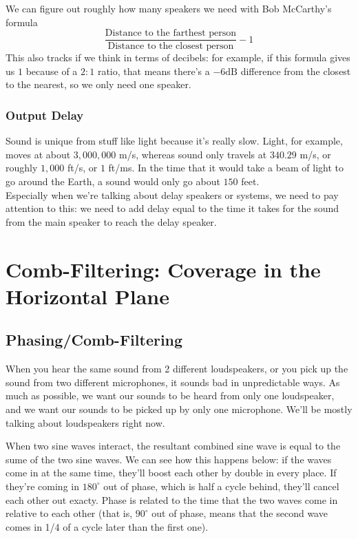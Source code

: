 \documentclass[a4paper]{article}
\begin{document}
We can figure out roughly how many speakers we need with Bob McCarthy's formula
\[
	\frac{\text{Distance to the farthest person}}{\text{Distance to the
	closest person}} - 1
\]
This also tracks if we think in terms of decibels: for example, if this formula
gives us $1$ because of a $2:1$ ratio, that means there's a $-6 \mathrm{dB}$
difference from the closest to the nearest, so we only need one speaker.

\subsubsection{Output Delay}

Sound is unique from stuff like light because it's really slow. Light, for
example, moves at about $3,000,000$ m/s, whereas sound only travels at $340.29$
m/s, or roughly $1,000$ ft/s, or $1$ ft/ms.
In the time that it would take a beam of light to go around the Earth, a
sound would only go about $150$ feet.\\
Especially when we're talking about delay speakers or systems, we need to pay
attention to this: we need to add delay equal to the time it takes for the
sound from the main speaker to reach the delay speaker.

\section[Horizontal Coverage]{Comb-Filtering: Coverage in the Horizontal Plane}

\subsection{Phasing/Comb-Filtering}

When you hear the same sound from 2 different loudspeakers, or you pick up the
sound from two different microphones, it sounds bad in unpredictable ways. As
much as possible, we want our sounds to be heard from only one loudspeaker, and
we want our sounds to be picked up by only one microphone. We'll be mostly
talking about loudspeakers right now.

When two sine waves interact, the resultant combined sine wave is equal to the
sume of the two sine waves. We can see how this happens below: if the waves
come in at the same time, they'll boost each other by double in every place. If
they're coming in $180^\circ$ out of phase, which is half a cycle behind, 
they'll cancel each other out exacty. Phase is related to the time that the two
waves come in relative to each other (that is, $90^\circ$ out of phase, means
that the second wave comes in 1/4 of a cycle later than the first one).
\end{document}
